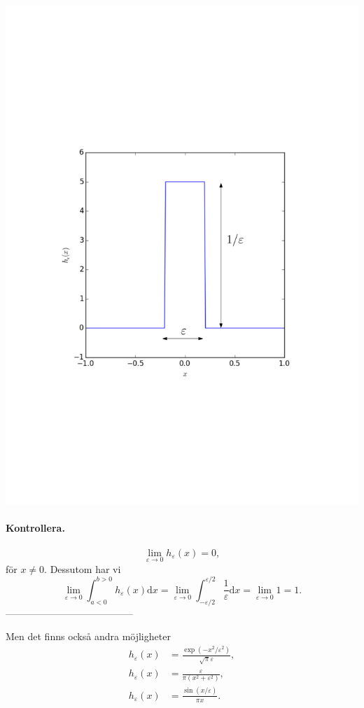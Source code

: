 \documentclass[%
oneside,                 %
final,                   %
10pt]{article}
\begin{document}
\centerline{\includegraphics[width=0.8\linewidth]{fig/delta_step.pdf}}



\paragraph{Kontrollera.}
$$
\lim_{\varepsilon \to 0} h_\varepsilon(x) = 0,
$$
för $x \neq 0$. Dessutom har vi
$$
\lim_{\varepsilon \to 0} \int_{a<0}^{b>0} h_\varepsilon(x) \mbox{d}x 
= \lim_{\varepsilon \to 0} \int_{-\varepsilon/2}^{\varepsilon/2} \frac{1}{\varepsilon} \mbox{d}x
= \lim_{\varepsilon \to 0} 1 = 1.
$$
---------------------------------------

Men det finns också andra möjligheter
\begin{align}
h_\varepsilon(x) &= \frac{\exp(-x^2 / \varepsilon^2)}{\sqrt{\pi} \varepsilon}, \\ 
h_\varepsilon(x) &= \frac{\varepsilon}{\pi (x^2 + \varepsilon^2)}, \\ 
h_\varepsilon(x) &= \frac{\sin(x/\varepsilon)}{\pi x} \label{eq:sinxdelta}.
\end{align}
\end{document}
